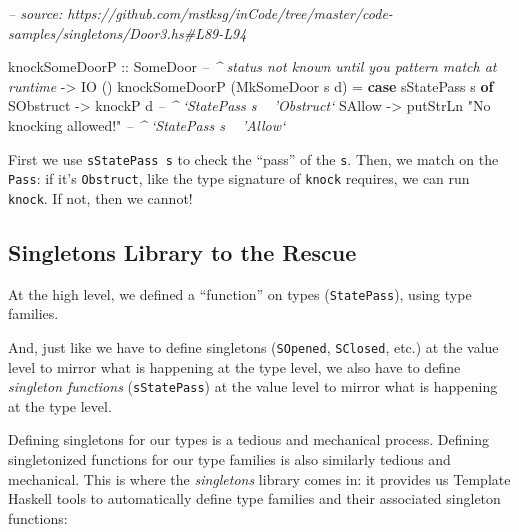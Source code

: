 \documentclass[]{article}
\newenvironment{Shaded}{}{}
\newcommand{\CommentTok}[1]{\textcolor[rgb]{0.38,0.63,0.69}{\textit{#1}}}
\newcommand{\DataTypeTok}[1]{\textcolor[rgb]{0.56,0.13,0.00}{#1}}
\newcommand{\FunctionTok}[1]{\textcolor[rgb]{0.02,0.16,0.49}{#1}}
\newcommand{\KeywordTok}[1]{\textcolor[rgb]{0.00,0.44,0.13}{\textbf{#1}}}
\newcommand{\NormalTok}[1]{#1}
\newcommand{\OtherTok}[1]{\textcolor[rgb]{0.00,0.44,0.13}{#1}}
\newcommand{\StringTok}[1]{\textcolor[rgb]{0.25,0.44,0.63}{#1}}
\begin{document}
\begin{Shaded}
\begin{Highlighting}[]
\CommentTok{-- source: https://github.com/mstksg/inCode/tree/master/code-samples/singletons/Door3.hs#L89-L94}

\NormalTok{knockSomeDoorP}
\OtherTok{    ::} \DataTypeTok{SomeDoor}     \CommentTok{-- ^ status not known until you pattern match at runtime}
    \OtherTok{->} \DataTypeTok{IO}\NormalTok{ ()}
\NormalTok{knockSomeDoorP (}\DataTypeTok{MkSomeDoor}\NormalTok{ s d) }\FunctionTok{=} \KeywordTok{case}\NormalTok{ sStatePass s }\KeywordTok{of}
    \DataTypeTok{SObstruct} \OtherTok{->}\NormalTok{ knockP d                        }\CommentTok{-- ^ `StatePass s ~ 'Obstruct`}
    \DataTypeTok{SAllow}    \OtherTok{->}\NormalTok{ putStrLn }\StringTok{"No knocking allowed!"} \CommentTok{-- ^ `StatePass s ~ 'Allow`}
\end{Highlighting}
\end{Shaded}

First we use \texttt{sStatePass\ s} to check the ``pass'' of the \texttt{s}.
Then, we match on the \texttt{Pass}: if it's
\texttt{\textquotesingle{}Obstruct}, like the type signature of \texttt{knock}
requires, we can run \texttt{knock}. If not, then we cannot!

\hypertarget{singletons-library-to-the-rescue}{%
\subsection{Singletons Library to the
Rescue}\label{singletons-library-to-the-rescue}}

At the high level, we defined a ``function'' on types (\texttt{StatePass}),
using type families.

And, just like we have to define singletons (\texttt{SOpened}, \texttt{SClosed},
etc.) at the value level to mirror what is happening at the type level, we also
have to define \emph{singleton functions} (\texttt{sStatePass}) at the value
level to mirror what is happening at the type level.

Defining singletons for our types is a tedious and mechanical process. Defining
singletonized functions for our type families is also similarly tedious and
mechanical. This is where the \emph{singletons} library comes in: it provides us
Template Haskell tools to automatically define type families and their
associated singleton functions:

\begin{Shaded}
\end{Shaded}
\end{document}
